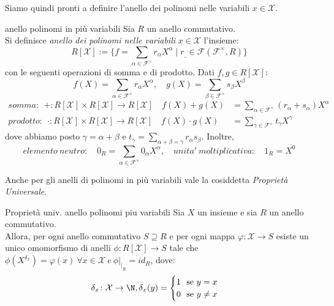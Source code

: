 \noindent
Siamo quindi pronti a definire l'anello dei polinomi nelle variabili $x \in \mathcal{X}$.
\begin{defn}{anello polinomi in più variabili}
	Sia $R$ un anello commutativo.\\
	Si definisce \emph{anello dei polinomi nelle variabili} $x \in \mathcal{X}$ l'insieme:
	\[R[\mathcal{X}] := \{f = \sum_{\alpha \in \mathcal{F}^\times}r_\alpha X^\alpha \mid r_{\_} \in \mathcal{F}(\mathcal{F}^\times,R)\}\]
  con le seguenti operazioni di somma e di prodotto. Dati $f, g \in R[\mathcal{X}]$:
  \[f(X) = \sum_{\alpha \in \mathcal{F}^\times}r_\alpha X^\alpha, \quad g(X) = \sum_{\beta \in \mathcal{F}^\times}s_\beta X^\beta\]
  \begin{align*}
    somma: \ \ + : R[\mathcal{X}] \times R[\mathcal{X}] \longrightarrow R[\mathcal{X}] \quad 
    f(X) + g(X) &= \sum\limits_{\alpha \in \mathcal{F}^\times}(r_\alpha + s_\alpha) X^\alpha\\
    prodotto: \ \ \cdot : R[\mathcal{X}] \times R[\mathcal{X}] \longrightarrow R[\mathcal{X}] \quad 
    f(X) \cdot g(X) &= \sum\limits_{\gamma \in \mathcal{F}^\times}t_\gamma X^\gamma
  \end{align*}
    dove abbiamo posto $\gamma = \alpha + \beta$ e $t_\gamma = \sum\limits_{\alpha + \beta = \gamma} r_\alpha s_\beta$. Inoltre,
	\[elemento \ neutro: \quad 0_R = \sum_{\alpha \in \mathcal{F}^\times} 0_\alpha X^\alpha, \quad unita' \ moltiplicativa: \quad 1_R = X^0 \]
\end{defn}

\newpage

\noindent
Anche per gli anelli di polinomi in più variabili vale la cosiddetta \textit{Proprietà Universale}.

\begin{prop}{Proprietà univ. anello polinomi piu variabili}
	Sia $X$ un insieme e sia $R$ un anello commutativo.\\
	Allora, per ogni anello commutativo $S\supseteq R$ e per ogni mappa $\varphi\colon \mathcal{X} \to S$ esiste un unico omomorfismo di anelli 
	$\phi\colon R[\mathcal{X}]\to S$ tale che $\phi(X^{\delta_x})=\varphi(x) \ \forall x \in \mathcal{X} \ e \ \phi |_{\vert_{R}}= id_R$, dove:
  \[\delta_x \colon \mathcal{X} \to \N , \delta_x(y)=
  \begin{cases}
    1 \text{ \ se }y=x\\
    0 \text{ \ se } y\neq x
  \end{cases}\]
\end{prop}

